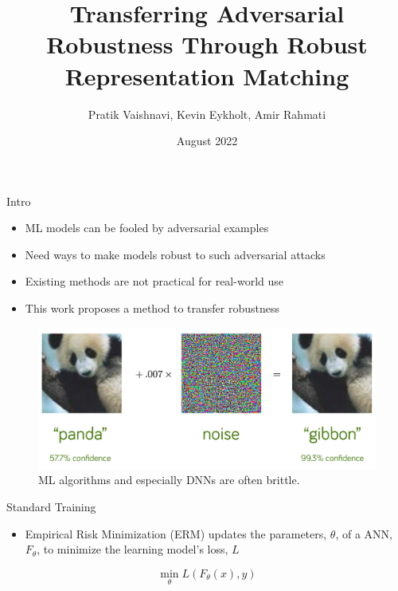 \documentclass{beamer}
\title[]{Transferring Adversarial Robustness Through Robust Representation Matching}
\author{Pratik Vaishnavi, Kevin Eykholt, Amir Rahmati}
\date{August 2022}
\begin{document}
\begin{frame}
  \titlepage
\end{frame}



\begin{frame}{Intro}

\begin{itemize}
	\item ML models can be fooled by adversarial examples
	\item Need ways to make models robust to such adversarial attacks
	\item Existing methods are not practical for real-world use
	\item This work proposes a method to transfer robustness
\end{itemize}

\end{frame}


\begin{frame}{}
	
	\begin{figure}
		\centering
		\includegraphics[scale=.25]{./images/adversarial_evasion_attack.png}
		\caption{ML algorithms and especially DNNs are often brittle.}
	\end{figure}
	
\end{frame}


\begin{frame}{Standard Training}
	
	\begin{itemize}
		\item Empirical Risk Minimization (ERM) updates the parameters, $\theta$, of a ANN, $F_\theta$, to minimize the learning model's loss, $L$
	\end{itemize}

	$$\min_{\theta} L(F_\theta(x), y)$$
	
\end{frame}
\end{document}
